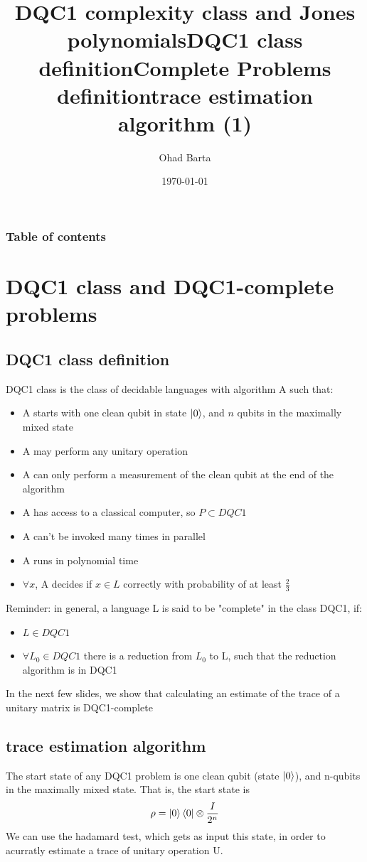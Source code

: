 \documentclass{article}
\begin{document}
\title{DQC1 complexity class and Jones polynomials} 
\author{Ohad Barta} 
\date{\today} 

\frame{\titlepage} 
\begin{frame}[allowframebreaks]
\frametitle{Table of contents}
{\tableofcontents}
\end{frame}



\section{DQC1 class and DQC1-complete problems}
\subsection{DQC1 class definition  } 
\title{DQC1 class definition} 
DQC1 class is the class of decidable languages with algorithm A such that:
\begin{itemize}
\item A starts with one clean qubit in state \(\left\vert{0}\right\rangle\), and $n$ qubits in the maximally mixed state
\item A may perform any unitary operation
\item A can only perform a measurement of the clean qubit at the end of the algorithm
\item A has access to a classical computer, so \(P \subset DQC1\) 
\item A can't be invoked many times in parallel
\item A runs in polynomial time
\item \(\forall x\), A decides if \(x \in L\) correctly with probability of at least \(\frac{2}{3}\)
\end{itemize}


\title{Complete Problems definition} 
Reminder: in general, a language L is said to be "complete" in the class DQC1, if:
\begin{itemize}
\item \(L \in DQC1\)
\item \(\forall L_{0} \in DQC1\) there is a reduction from \(L_{0}\) to L, such that the reduction algorithm is in DQC1  
\end{itemize}
In the next few slides, we show that calculating an estimate of the trace of a unitary matrix is DQC1-complete


\subsection{trace estimation algorithm  }
\title{trace estimation algorithm (1)}
The start state of any DQC1 problem is one clean qubit (state \(\left\vert{0}\right\rangle\)), and n-qubits in the maximally mixed state.
That is, the start state is \begin{equation}
\rho = \left\vert{0}\right\rangle\left\langle{0}\right\vert\otimes\frac{I}{2^n}
\end{equation}
We can use the hadamard test, which gets as input this state, in order to acurratly estimate a trace
of unitary operation U.
\end{document}
